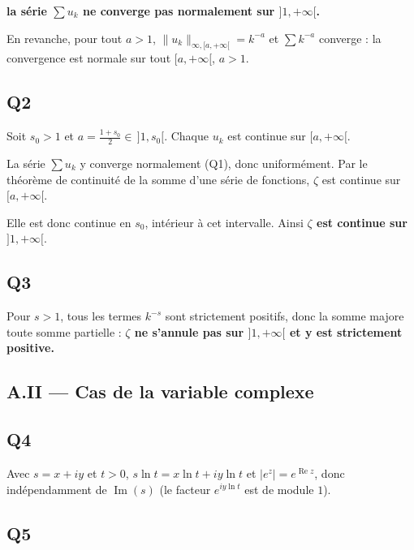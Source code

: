 \documentclass[11pt,a4paper]{article}
\newcommand{\equationajustee}[1]{%
  \sbox{\boiteequation}{$\displaystyle #1$}%
  \ifdim\wd\boiteequation>\linewidth
    \[\resizebox{\linewidth}{!}{\usebox{\boiteequation}}\]%
  \else
    \[#1\]%
  \fi}
\begin{document}
\textbf{la série \(\sum u_k\) ne converge pas normalement sur \(]1,+\infty[\).}

En revanche, pour tout \(a>1\), \(\|u_k\|_{\infty,[a,+\infty[}=k^{-a}\) et \(\sum k^{-a}\) converge : la convergence est normale sur tout \([a,+\infty[\), \(a>1\).

\hypertarget{q2}{%
\subsection{Q2}\label{q2}}

Soit \(s_0>1\) et \(a=\frac{1+s_0}{2}\in\,]1,s_0[\). Chaque \(u_k\) est continue sur \([a,+\infty[\).

La série \(\sum u_k\) y converge normalement (Q1), donc uniformément. Par le théorème de continuité de la somme d'une série de fonctions, \(\zeta\) est continue sur \([a,+\infty[\).

Elle est donc continue en \(s_0\), intérieur à cet intervalle. Ainsi \textbf{\(\zeta\) est continue sur \(]1,+\infty[\)}.

\hypertarget{q3}{%
\subsection{Q3}\label{q3}}

Pour \(s>1\), tous les termes \(k^{-s}\) sont strictement positifs, donc la somme majore toute somme partielle :
\equationajustee{\boxed{\zeta(s)\geqslant \frac1{1^s}=1>0.}}
\textbf{\(\zeta\) ne s'annule pas sur \(]1,+\infty[\) et y est strictement positive.}

\hypertarget{a.ii-cas-de-la-variable-complexe}{%
\subsection{A.II --- Cas de la variable complexe}\label{a.ii-cas-de-la-variable-complexe}}

\hypertarget{q4}{%
\subsection{Q4}\label{q4}}

Avec \(s=x+iy\) et \(t>0\), \(s\ln t=x\ln t+iy\ln t\) et \(|e^z|=e^{\operatorname{Re} z}\), donc
\equationajustee{\boxed{|t^s|=e^{x\ln t}=t^{\operatorname{Re}(s)}}}
indépendamment de \(\operatorname{Im}(s)\) (le facteur \(e^{iy\ln t}\) est de module \(1\)).

\hypertarget{q5}{%
\subsection{Q5}\label{q5}}
\end{document}
